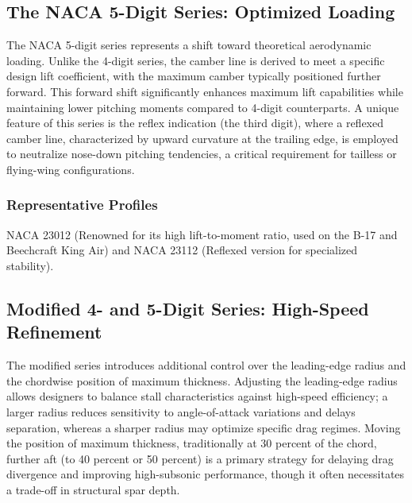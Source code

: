 \subsection*{The NACA 5-Digit Series: Optimized Loading}

The NACA 5-digit series represents a shift toward theoretical aerodynamic loading. 
Unlike the 4-digit series, the camber line is derived to meet a specific design lift coefficient, with the maximum camber typically positioned further forward. 
This forward shift significantly enhances maximum lift capabilities while maintaining lower pitching moments compared to 4-digit counterparts. 
A unique feature of this series is the reflex indication (the third digit), where a reflexed camber line, 
characterized by upward curvature at the trailing edge, 
is employed to neutralize nose-down pitching tendencies, a critical requirement for tailless or flying-wing configurations.


\subsubsection*{Representative Profiles}
NACA 23012 (Renowned for its high lift-to-moment ratio, used on the B-17 and Beechcraft King Air) 
and NACA 23112 (Reflexed version for specialized stability).


\subsection*{Modified 4- and 5-Digit Series: High-Speed Refinement}

The modified series introduces additional control over the leading-edge radius and the chordwise position of maximum thickness. 
Adjusting the leading-edge radius allows designers to balance stall characteristics against high-speed efficiency; a larger radius reduces sensitivity to angle-of-attack variations and delays separation, 
whereas a sharper radius may optimize specific drag regimes. 
Moving the position of maximum thickness, 
traditionally at 30 percent of the chord, 
further aft (to 40 percent or 50 percent) is a primary strategy 
for delaying drag divergence and improving high-subsonic performance, 
though it often necessitates a trade-off in structural spar depth.

